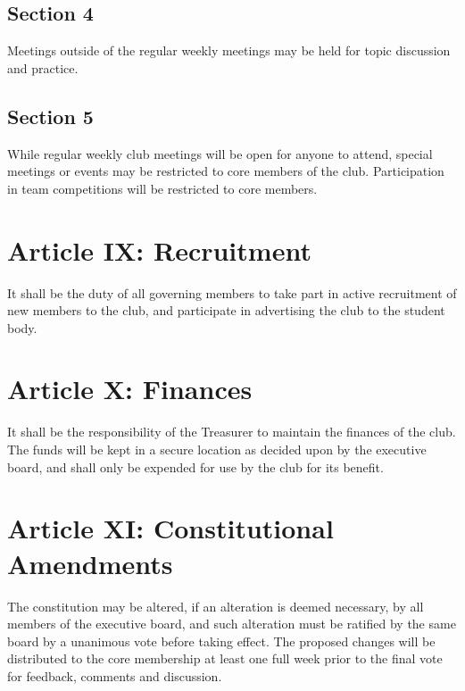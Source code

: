 \documentclass[10pt]{article}
\begin{document}
\subsection*{Section 4}
Meetings outside of the regular weekly meetings may be held for topic discussion and practice.
\subsection*{Section 5}
While regular weekly club meetings will be open for anyone to attend, special meetings or events may
be restricted to core members of the club. Participation in team competitions will be restricted to core
members.
\vspace{0.2in}

\section*{Article IX: Recruitment}
It shall be the duty of all governing members to take part in active recruitment of new members to the
club, and participate in advertising the club to the student body.
\vspace{0.2in}

\section*{Article X: Finances}
It shall be the responsibility of the Treasurer to maintain the finances of the club. The funds will be kept
in a secure location as decided upon by the executive board, and shall only be expended for use by the
club for its benefit.
\vspace{0.2in}

\section*{Article XI: Constitutional Amendments}
The constitution may be altered, if an alteration is deemed necessary, by all members of the executive
board, and such alteration must be ratified by the same board by a unanimous vote before taking effect.
The proposed changes will be distributed to the core membership at least one full week prior to the
final vote for feedback, comments and discussion.
\end{document}
